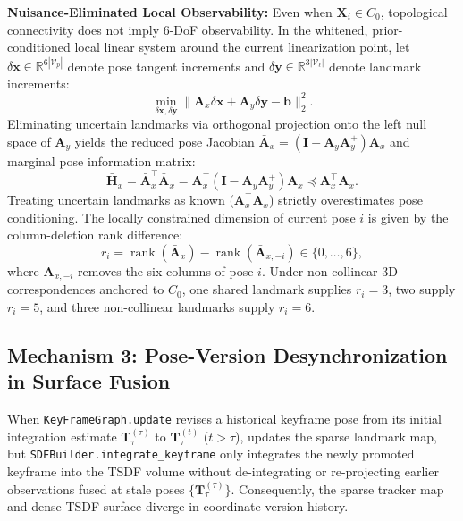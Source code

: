 \documentclass[10pt,journal]{IEEEtran}
\begin{document}
\textbf{Nuisance-Eliminated Local Observability:} Even when $\mathbf{X}_i\in C_0$, topological connectivity does not imply 6-DoF observability. In the whitened, prior-conditioned local linear system around the current linearization point, let $\delta\mathbf{x}\in\mathbb{R}^{6|\mathcal{V}_p|}$ denote pose tangent increments and $\delta\mathbf{y}\in\mathbb{R}^{3|\mathcal{V}_\ell|}$ denote landmark increments:
\begin{equation}
    \min_{\delta\mathbf{x},\delta\mathbf{y}}\|\mathbf{A}_x\delta\mathbf{x}+\mathbf{A}_y\delta\mathbf{y}-\mathbf{b}\|_2^2.
    \label{eq:joint_ls}
\end{equation}
Eliminating uncertain landmarks via orthogonal projection onto the left null space of $\mathbf{A}_y$ yields the reduced pose Jacobian $\bar{\mathbf{A}}_x=(\mathbf{I}-\mathbf{A}_y\mathbf{A}_y^+)\mathbf{A}_x$ and marginal pose information matrix:
\begin{equation}
    \bar{\mathbf{H}}_x=\bar{\mathbf{A}}_x^\top\bar{\mathbf{A}}_x=\mathbf{A}_x^\top(\mathbf{I}-\mathbf{A}_y\mathbf{A}_y^+)\mathbf{A}_x\preceq\mathbf{A}_x^\top\mathbf{A}_x.
    \label{eq:schur_info}
\end{equation}
Treating uncertain landmarks as known ($\mathbf{A}_x^\top\mathbf{A}_x$) strictly overestimates pose conditioning. The locally constrained dimension of current pose $i$ is given by the column-deletion rank difference:
\begin{equation}
    r_i=\operatorname{rank}(\bar{\mathbf{A}}_x)-\operatorname{rank}(\bar{\mathbf{A}}_{x,-i})\in\{0,\dots,6\},
    \label{eq:rank_diff}
\end{equation}
where $\bar{\mathbf{A}}_{x,-i}$ removes the six columns of pose $i$. Under non-collinear 3D correspondences anchored to $C_0$, one shared landmark supplies $r_i=3$, two supply $r_i=5$, and three non-collinear landmarks supply $r_i=6$.

\subsection{Mechanism 3: Pose-Version Desynchronization in Surface Fusion}
When \texttt{KeyFrameGraph.update} revises a historical keyframe pose from its initial integration estimate $\mathbf{T}_\tau^{(\tau)}$ to $\mathbf{T}_\tau^{(t)}$ ($t>\tau$),  updates the sparse landmark map, but \texttt{SDFBuilder.integrate\_keyframe} only integrates the newly promoted keyframe into the TSDF volume without de-integrating or re-projecting earlier observations fused at stale poses $\{\mathbf{T}_\tau^{(\tau)}\}$. Consequently, the sparse tracker map and dense TSDF surface diverge in coordinate version history.
\end{document}
